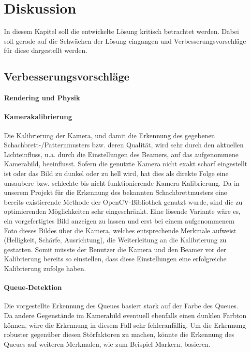 \chapter{Diskussion}
In diesem Kapitel soll die entwickelte Lösung kritisch betrachtet werden. Dabei soll gerade auf die Schwächen der Lösung eingangen und Verbesserungsvorschläge für diese dargestellt werden.



\section{Verbesserungsvorschläge}

\subsubsection{Rendering und Physik}

\subsubsection{Kamerakalibrierung}
Die Kalibrierung der Kamera, und damit die Erkennung des gegebenen Schachbrett-/Patternmusters bzw. deren Qualität, wird sehr durch den aktuellen Lichteinfluss, u.a. durch die Einstellungen des Beamers, auf das aufgenommene Kamerabild, beeinflusst.
Sofern die genutzte Kamera nicht exakt scharf eingestellt ist oder das Bild zu dunkel oder zu hell wird, hat dies als direkte Folge eine unsaubere bzw. schlechte bis nicht funktionierende Kamera-Kalibrierung. 
Da in unserem Projekt für die Erkennung des bekannten Schachbrettmusters eine bereits existierende Methode der OpenCV-Bibliothek genutzt wurde, sind die zu optimierenden Möglichkeiten sehr eingeschränkt.
Eine lösende Variante wäre es, ein vorgefertigtes Bild anzeigen zu lassen und erst bei einem aufgenommenem Foto dieses Bildes über die Kamera, welches entsprechende Merkmale aufweist (Helligkeit, Schärfe, Ausrichtung), die Weiterleitung an die Kalibrierung zu gestatten. Somit müsste der Benutzer die Kamera und den Beamer vor der Kalibrierung bereits so einstellen, dass diese Einstellungen eine erfolgreiche Kalibrierung zufolge haben.

\subsubsection{Queue-Detektion}
Die vorgestellte Erkennung des Queues basiert stark auf der Farbe des Queues. 
Da andere Gegenstände im Kamerabild eventuell ebenfalls einen dunklen Farbton können, wäre die Erkennung in diesem Fall sehr fehleranfällig. 
Um die Erkennung robuster gegenüber diesen Störfaktoren zu machen, könnte die Erkennung des Queues auf weiteren Merkmalen, wie zum Beispiel Markern, basieren.


